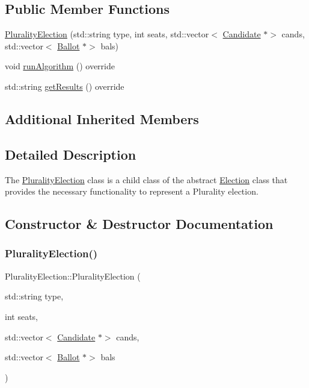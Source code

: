 \subsection*{Public Member Functions}
\begin{DoxyCompactItemize}
\item 
\hyperlink{classPluralityElection_a03dd61a9d6738ec26e80d10acb02df7d}{Plurality\+Election} (std\+::string type, int seats, std\+::vector$<$ \hyperlink{classCandidate}{Candidate} $\ast$$>$ cands, std\+::vector$<$ \hyperlink{classBallot}{Ballot} $\ast$$>$ bals)
\item 
void \hyperlink{classPluralityElection_a9517806e8ba40496c49013acc7ad9ca5}{run\+Algorithm} () override
\item 
std\+::string \hyperlink{classPluralityElection_a60f88a34588ca87678b0f5367adf1a55}{get\+Results} () override
\end{DoxyCompactItemize}
\subsection*{Additional Inherited Members}


\subsection{Detailed Description}
The \hyperlink{classPluralityElection}{Plurality\+Election} class is a child class of the abstract \hyperlink{classElection}{Election} class that provides the necessary functionality to represent a Plurality election. 

\subsection{Constructor \& Destructor Documentation}
\mbox{\label{classPluralityElection_a03dd61a9d6738ec26e80d10acb02df7d}} 
\subsubsection{\texorpdfstring{Plurality\+Election()}{PluralityElection()}}
{\footnotesize\ttfamily Plurality\+Election\+::\+Plurality\+Election (\begin{DoxyParamCaption}\item[{std\+::string}]{type,  }\item[{int}]{seats,  }\item[{std\+::vector$<$ \hyperlink{classCandidate}{Candidate} $\ast$$>$}]{cands,  }\item[{std\+::vector$<$ \hyperlink{classBallot}{Ballot} $\ast$$>$}]{bals }\end{DoxyParamCaption})}

